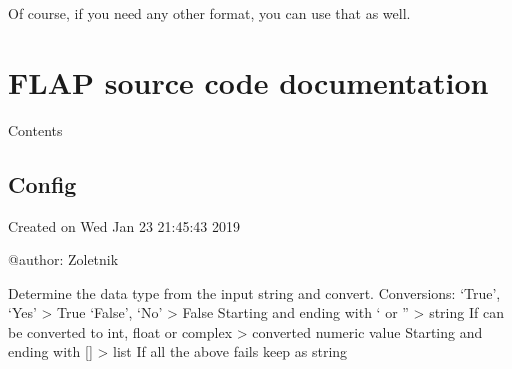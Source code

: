 \documentclass[letterpaper,10pt,english]{sphinxmanual}
\begin{document}
Of course, if you need any other format, you can use that as well.


\chapter{FLAP source code documentation}
\label{\detokenize{sourcecode:flap-source-code-documentation}}\label{\detokenize{sourcecode::doc}}
Contents


\section{Config}
\label{\detokenize{config:module-flap.config}}\label{\detokenize{config:config}}\label{\detokenize{config::doc}}
Created on Wed Jan 23 21:45:43 2019

@author: Zoletnik

\begin{fulllineitems}
\label{\detokenize{config:flap.config.interpret_config_value}}
Determine the data type from the input string and convert.
Conversions:
‘True’, ‘Yes’ \textendash{}\textgreater{} True
‘False’, ‘No’ \textendash{}\textgreater{} False
Starting and ending with ‘ or ” \textendash{}\textgreater{} string
If can be converted to int, float or complex \textendash{}\textgreater{} converted numeric value
Starting and ending with {[}{]} \textendash{}\textgreater{} list
If all the above fails keep as string

\end{fulllineitems}

\end{document}
